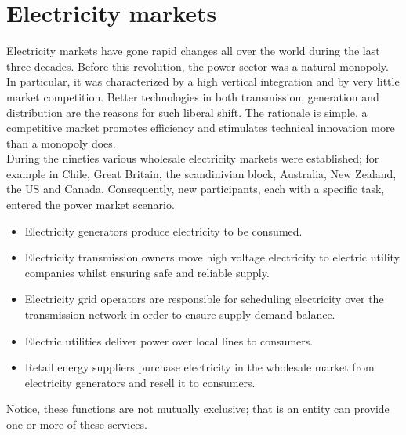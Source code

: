 \section{Electricity markets}
Electricity markets have gone rapid changes all over the world during the last three decades.
Before this revolution, the power sector was a natural monopoly. In particular, it was characterized by a high vertical integration and by very little market competition. Better technologies in both transmission, generation and distribution are the reasons for such liberal shift. The rationale is simple, a competitive market promotes efficiency and stimulates technical innovation more than a monopoly does.
\\
During the nineties various wholesale electricity markets were established; for example in Chile, Great Britain, the scandinivian block, Australia, New Zealand, the US and Canada. Consequently, new participants, each with a specific task, entered the power market scenario.
\begin{itemize}
    \item Electricity generators produce electricity to be consumed.
    \item Electricity transmission owners 
    move high voltage electricity to electric utility companies whilst ensuring safe and reliable supply.
    \item Electricity grid operators are responsible for scheduling electricity over the transmission network in order to ensure supply demand balance.
    \item Electric utilities deliver power over local lines to consumers. 
    \item Retail energy suppliers purchase electricity in the wholesale market from electricity generators and resell it to consumers.
\end{itemize}
Notice, these functions are not mutually exclusive; that is an entity can provide one or more of these services.


